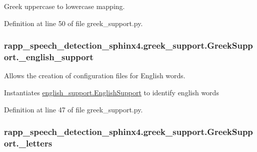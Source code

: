 Greek uppercase to lowercase mapping. 



Definition at line 50 of file greek\-\_\-support.\-py.

\hypertarget{classrapp__speech__detection__sphinx4_1_1greek__support_1_1GreekSupport_aff5fd96d6423b28163b900c2ea06e188}{
\subsubsection[{\-\_\-english\-\_\-support}]{\setlength{\rightskip}{0pt plus 5cm}rapp\-\_\-speech\-\_\-detection\-\_\-sphinx4.\-greek\-\_\-support.\-Greek\-Support.\-\_\-english\-\_\-support\hspace{0.3cm}{\ttfamily [private]}}}\label{classrapp__speech__detection__sphinx4_1_1greek__support_1_1GreekSupport_aff5fd96d6423b28163b900c2ea06e188}


Allows the creation of configuration files for English words. 

Instantiates \hyperlink{classrapp__speech__detection__sphinx4_1_1english__support_1_1EnglishSupport}{english\-\_\-support.\-English\-Support} to identify english words 

Definition at line 47 of file greek\-\_\-support.\-py.

\hypertarget{classrapp__speech__detection__sphinx4_1_1greek__support_1_1GreekSupport_a6115cc5d04ce7f8e891f5b112f8d4151}{
\subsubsection[{\-\_\-letters}]{\setlength{\rightskip}{0pt plus 5cm}rapp\-\_\-speech\-\_\-detection\-\_\-sphinx4.\-greek\-\_\-support.\-Greek\-Support.\-\_\-letters\hspace{0.3cm}{\ttfamily [private]}}}\label{classrapp__speech__detection__sphinx4_1_1greek__support_1_1GreekSupport_a6115cc5d04ce7f8e891f5b112f8d4151}


